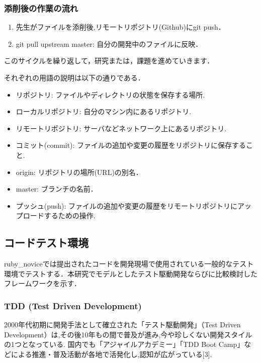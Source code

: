 \subsubsection{添削後の作業の流れ}
\begin{enumerate}
\item 先生がファイルを添削後,リモートリポジトリ(Github)にgit push．
\item git pull upstream master: 自分の開発中のファイルに反映．
\end{enumerate}
このサイクルを繰り返して，研究または，課題を進めていきます．

それぞれの用語の説明は以下の通りである．

\begin{itemize}
\item リポジトリ:          ファイルやディレクトリの状態を保存する場所.
\item ローカルリポジトリ:  自分のマシン内にあるリポジトリ.
\item リモートリポジトリ:  サーバなどネットワーク上にあるリポジトリ.
\item コミット(commit):    ファイルの追加や変更の履歴をリポジトリに保存すること.
\item origin:              リポジトリの場所(URL)の別名．
\item master:              ブランチの名前．
\item プッシュ(push):      ファイルの追加や変更の履歴をリモートリポジトリにアップロードするための操作.
\end{itemize}
\subsection{コードテスト環境}
ruby\_noviceでは提出されたコードを開発現場で使用されている一般的なテスト環境でテストする．本研究でモデルとしたテスト駆動開発ならびに比較検討したフレームワークを示す．

\subsubsection{TDD (Test Driven Development)}
2000年代初期に開発手法として確立された「テスト駆動開発」（Test Driven Development）は,その後10年もの間で普及が進み,今や珍しくない開発スタイルの1つとなっている.
国内でも「アジャイルアカデミー」「TDD Boot Camp」などによる推進・普及活動が各地で活発化し,認知が広がっている[3].

